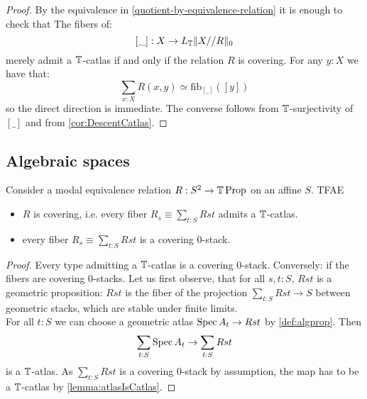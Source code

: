 \begin{proof}
	By the equivalence in \ref{quotient-by-equivalence-relation} it is enough to check that
	The fibers of: 
	\[[\_]:X\to L_{\mathbb{T}} \| X//R \|_0\] 
	merely admit a $\mathbb{T}$-catlas if and only if the relation $R$ is covering. For any $y:X$ we have that:
	\[\sum_{x:X} R(x,y) \simeq \mathrm{fib}_{[\_]}([y])\]
	so the direct direction is immediate. The converse follows from $\mathbb{T}$-surjectivity of $[\_]$ and from \ref{cor:DescentCatlas}.
\end{proof}

\subsection{Algebraic spaces}

\begin{lemma}{\label{def:coveringEqRel}}
		Consider a modal equivalence relation $R : S^2 \to \mathbb{T} \operatorname{Prop}$ on an affine $S$. TFAE
		\begin{itemize}
			\item $R$ is covering, i.e. every fiber $R_s \equiv \sum_{t: S} R s t$ admits a $\mathbb{T}$-catlas.
			\item  every fiber $R_s \equiv \sum_{t: S} R s t$ is a covering 0-stack.
\end{itemize}
\end{lemma}
\begin{proof}
Every type admitting a $\mathbb{T}$-catlas is a covering 0-stack. 
Conversely: if the fibers are covering 0-stacks. Let us first observe, that for all $s , t : S$, $R s t$ is a geometric proposition: $R s t$ is the fiber of the projection $\sum_{t : S} R s t \to S$ between geometric stacks, which are stable under finite limits. \\

For all $t : S$ we can choose a geometric atlas $\operatorname{Spec} A_t \to R s t$ by \ref{def:algprop}. Then 
\[
\sum_{t:S} \operatorname{Spec} A_t \to \sum_{t : S} R s t
\]
is a $\mathbb{T}$-atlas. As $\sum_{t : S} R s t$ is a covering 0-stack by assumption, the map has to be a $\mathbb{T}$-catlas by \ref{lemma:atlasIsCatlas}. 
\end{proof}

